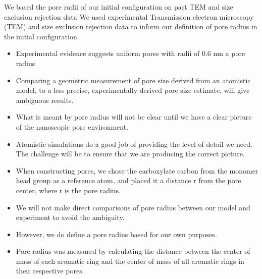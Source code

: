 \documentclass{article}
\begin{document}
  We based the pore radii of our initial configuration on past TEM and size exclusion 
  rejection data
  We used experimental Transmission electron microscopy (TEM) and size exclusion rejection
  data \cite{feng_scalable_2014,feng_thin_2016,zhou_supported_2005} to inform our definition
  of pore radius in the initial configuration.
  \begin{itemize}
    \item Experimental evidence suggests uniform pores with radii of 0.6 nm a pore radius
    \item Comparing a geometric measurement of pore size derived from an 
    atomistic model, to a less precise, experimentally derived pore size estimate,
    will give ambiguous results.
    \item What is meant by pore radius will not be clear until we have a clear picture
    of the nanoscopic pore environment.
    \item Atomistic simulations do a good job of providing the level of detail we need. The challenge
    will be to ensure that we are producing the correct picture.
    \item When constructing pores, we chose the carboxylate carbon from the monomer
    head group as a reference atom, and placed it a distance r from the pore center,
    where r is the pore radius.  %
    \item We will not make direct comparisons of pore radius between our model 
    and experiment to avoid the ambiguity. 
    \item However, we do define a pore radius based for our own purposes.
    \item Pore radius was measured by calculating the distance between the center of 
    mass of each aromatic ring and the center of mass of all aromatic rings in their 
    respective pores.
  \end{itemize}
  
\end{document}
